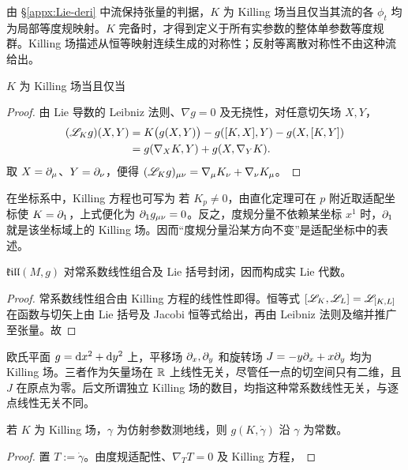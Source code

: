 由 \S\ref{appx:Lie-deri} 中流保持张量的判据，$K$ 为 Killing 场当且仅当其流的各 $\phi_t$ 均为局部等度规映射。$K$ 完备时，才得到定义于所有实参数的整体单参数等度规群。Killing 场描述从恒等映射连续生成的对称性；反射等离散对称性不由这种流给出。

\begin{theorem}[Killing 方程]
    $K$ 为 Killing 场当且仅当
\end{theorem}
\begin{proof}
    由 Lie 导数的 Leibniz 法则、$\nabla g=0$ 及无挠性，对任意切矢场 $X,Y$，
    \begin{align*}
        (\mathscr{L}_Kg)(X,Y)
        &=K\bigl(g(X,Y)\bigr)-g([K,X],Y)-g(X,[K,Y])\\
        &=g(\nabla_XK,Y)+g(X,\nabla_YK).
    \end{align*}
    取 $X=\partial_\mu$、$Y=\partial_\nu$，便得 $(\mathscr{L}_Kg)_{\mu\nu}=\nabla_\mu K_\nu+\nabla_\nu K_\mu$。
\end{proof}

在坐标系中，Killing 方程也可写为
若 $K_p\ne0$，由直化定理可在 $p$ 附近取适配坐标使 $K=\partial_1$，上式便化为 $\partial_1g_{\mu\nu}=0$。反之，度规分量不依赖某坐标 $x^1$ 时，$\partial_1$ 就是该坐标域上的 Killing 场。因而“度规分量沿某方向不变”是适配坐标中的表述。

\begin{theorem}
    $\mathfrak{kill}(M,g)$ 对常系数线性组合及 Lie 括号封闭，因而构成实 Lie 代数。
\end{theorem}
\begin{proof}
    常系数线性组合由 Killing 方程的线性性即得。恒等式
    $[\mathscr{L}_K,\mathscr{L}_L]=\mathscr{L}_{[K,L]}$ 在函数与切矢上由 Lie 括号及 Jacobi 恒等式给出，再由 Leibniz 法则及缩并推广至张量。故
\end{proof}

\begin{example}
    欧氏平面 $g=\dd x^2+\dd y^2$ 上，平移场 $\partial_x,\partial_y$ 和旋转场 $J=-y\partial_x+x\partial_y$ 均为 Killing 场。三者作为矢量场在 $\mathbb{R}$ 上线性无关，尽管任一点的切空间只有二维，且 $J$ 在原点为零。后文所谓独立 Killing 场的数目，均指这种常系数线性无关，与逐点线性无关不同。
\end{example}

\begin{theorem}
    若 $K$ 为 Killing 场，$\gamma$ 为仿射参数测地线，则 $g(K,\dot\gamma)$ 沿 $\gamma$ 为常数。
\end{theorem}
\begin{proof}
    置 $T:=\dot\gamma$。由度规适配性、$\nabla_TT=0$ 及 Killing 方程，
\end{proof}

